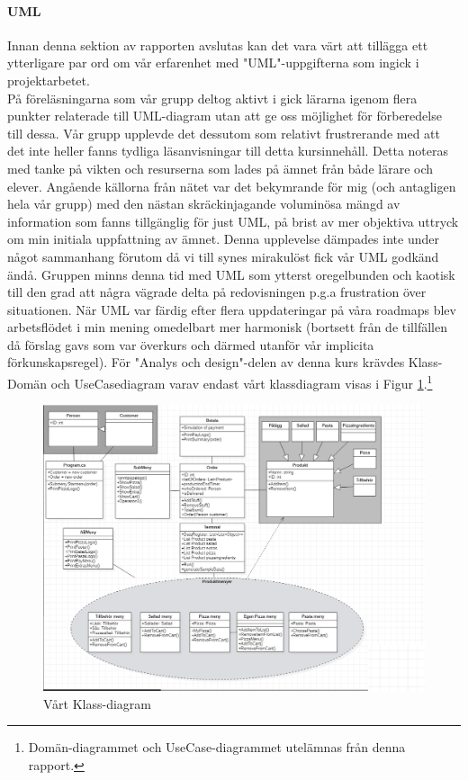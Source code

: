 \documentclass{article}
\theoremstyle{remark}                                         %
\begin{document}
\paragraph{UML}
Innan denna sektion av rapporten avslutas kan det vara värt att tillägga ett ytterligare par ord om vår erfarenhet med "UML"-uppgifterna som ingick i  projektarbetet. \\
På föreläsningarna som vår grupp deltog aktivt i gick lärarna igenom flera punkter relaterade till UML-diagram utan att ge oss möjlighet för förberedelse till dessa. Vår grupp upplevde det dessutom som relativt frustrerande med att det inte heller fanns tydliga läsanvisningar till detta kursinnehåll. Detta noteras med tanke på vikten och resurserna som lades på ämnet från både lärare och elever. Angående källorna från nätet var det  bekymrande för mig (och antagligen hela vår grupp) med den nästan skräckinjagande voluminösa mängd av information som fanns tillgänglig för just UML, på brist av mer objektiva uttryck om min initiala uppfattning av ämnet. Denna upplevelse dämpades inte under något sammanhang förutom då vi till synes mirakulöst fick vår UML godkänd ändå. Gruppen minns denna tid med UML som ytterst oregelbunden och kaotisk till den grad att några vägrade delta på redovisningen p.g.a frustration över situationen. När UML var färdig efter flera uppdateringar på våra roadmaps blev arbetsflödet i min mening omedelbart mer harmonisk (bortsett från de tillfällen då förslag gavs som var överkurs och därmed utanför vår implicita förkunskapsregel). För "Analys och design"-delen av denna kurs krävdes Klass- Domän och UseCasediagram varav endast vårt klassdiagram visas i Figur \ref{fig:klassdiagram}.\footnote{Domän-diagrammet och UseCase-diagrammet utelämnas från denna rapport.}  

\begin{figure}
        \includegraphics[width=\textwidth]{img/UML_KLASSD.PNG}
        \caption{Vårt Klass-diagram}
        \label{fig:klassdiagram}
\end{figure}
\end{document}
